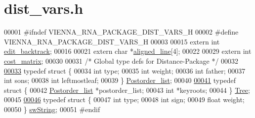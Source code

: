 \hypertarget{dist__vars_8h_source}{}\section{dist\+\_\+vars.\+h}
\label{dist__vars_8h_source}

\begin{DoxyCode}
00001 \textcolor{preprocessor}{#ifndef VIENNA\_RNA\_PACKAGE\_DIST\_VARS\_H}
00002 \textcolor{preprocessor}{#define VIENNA\_RNA\_PACKAGE\_DIST\_VARS\_H}
00003 
00015 \textcolor{keyword}{extern} \textcolor{keywordtype}{int}   \hyperlink{dist__vars_8h_aa03194c513af6b860e7b33e370b82bdb}{edit\_backtrack};
00016 
00021 \textcolor{keyword}{extern} \textcolor{keywordtype}{char} *\hyperlink{dist__vars_8h_ac1605fe3448ad0a0b809c4fb8f6a854a}{aligned\_line}[4];
00022 
00029 \textcolor{keyword}{extern} \textcolor{keywordtype}{int}  \hyperlink{dist__vars_8h_ab65d8ff14c6937612212526a60f59b3c}{cost\_matrix};
00030 
00031 \textcolor{comment}{/*  Global type defs for Distance-Package */}
00032 
\hypertarget{dist__vars_8h_source_l00033}{}\hyperlink{structPostorder__list}{00033} \textcolor{keyword}{typedef} \textcolor{keyword}{struct }\{
00034                  \textcolor{keywordtype}{int}  type;
00035                  \textcolor{keywordtype}{int}  weight;
00036                  \textcolor{keywordtype}{int}  father;
00037                  \textcolor{keywordtype}{int}  sons;
00038                  \textcolor{keywordtype}{int}  leftmostleaf;
00039                \} \hyperlink{structPostorder__list}{Postorder\_list};
00040 
\hypertarget{dist__vars_8h_source_l00041}{}\hyperlink{structTree}{00041} \textcolor{keyword}{typedef} \textcolor{keyword}{struct }\{
00042                  \hyperlink{structPostorder__list}{Postorder\_list} *postorder\_list;
00043                  \textcolor{keywordtype}{int}            *keyroots;
00044                \} \hyperlink{structTree}{Tree};
00045 
\hypertarget{dist__vars_8h_source_l00046}{}\hyperlink{structswString}{00046} \textcolor{keyword}{typedef} \textcolor{keyword}{struct }\{
00047                  \textcolor{keywordtype}{int}    type;
00048                  \textcolor{keywordtype}{int}    sign;
00049                  \textcolor{keywordtype}{float}  weight;
00050                \} \hyperlink{structswString}{swString};
00051 \textcolor{preprocessor}{#endif}
\end{DoxyCode}
